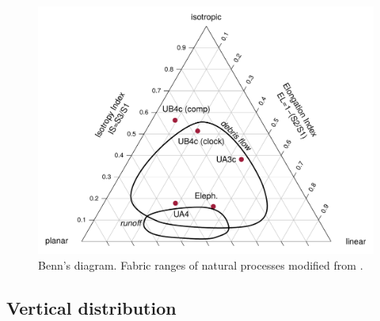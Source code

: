 \documentclass[preprint,authoryear,times]{elsarticle} %
\begin{document}
\begin{figure}[]
  \centering
  \includegraphics[width=1\textwidth]{./artwork/Fig8.pdf}
  \caption{Benn's diagram. Fabric ranges of natural processes modified from \cite{Lenoble2004}.}
  \label{fig:8}
\end{figure}

\subsection{Vertical distribution}


\end{document}
